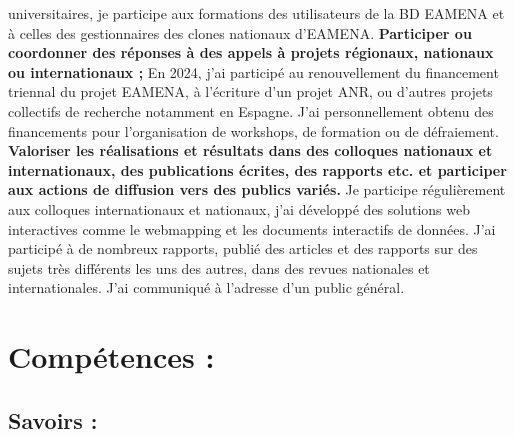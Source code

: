 \documentclass[12pt]{article}
\begin{document}
universitaires, je participe aux formations des utilisateurs de la BD EAMENA et à celles des gestionnaires des clones nationaux
d'EAMENA.
\smallbreak
\textbf{Participer ou coordonner des réponses à des appels à projets régionaux, nationaux ou internationaux ;}
En 2024, j'ai participé au renouvellement du financement triennal du projet EAMENA, à l'écriture d'un projet ANR, ou
d'autres projets collectifs de recherche notamment en Espagne. J'ai personnellement obtenu des financements pour
l'organisation de workshops, de formation ou de défraiement.
\smallbreak
\textbf{Valoriser les réalisations et résultats dans des colloques nationaux et internationaux, des publications écrites, des
rapports etc. et participer aux actions de diffusion vers des publics variés.}
Je participe régulièrement aux colloques internationaux et nationaux, j'ai développé des solutions web interactives
comme le webmapping et les documents interactifs de données. J'ai participé à de nombreux rapports, publié des articles
et des rapports sur des sujets très différents les uns des autres, dans des revues nationales et internationales. J'ai
communiqué à l'adresse d'un public général.

\section*{Compétences :}

\subsection*{Savoirs :}
\end{document}
